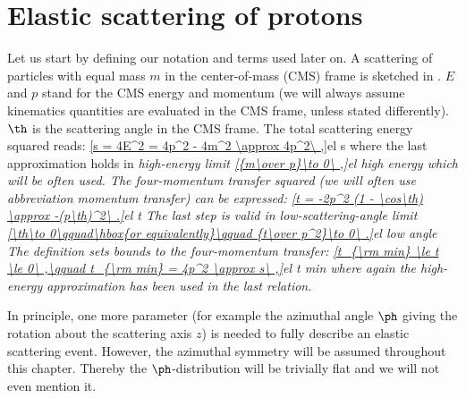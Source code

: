 \def\FC{F^{\rm C}}
\def\FH{F^{\rm H}}
\def\FCH{F^{\rm C+H}}
\def\e{{\rm e}}

\def\KL{Kudr\' at-Lokaj\' i\v cek}
\def\KaL{Kudr\' at and Lokaj\' i\v cek}
\def\WY{West-Yennie}
\def\WaY{West and Yennie}

\def\caption#1{%
	\vskip\baselineskip
	\em{#1}%
	\vskip\baselineskip
}

\iffalse
CMS, QCD, QFT, LHC, BFKL, HP, LxG, RMS, QED, QM, OPE, TPE, IR, KL, CKL, WY, SWY
ATLAS ALFA, TDR
\fi


\chapter{Elastic scattering of protons}


Let us start by defining our notation and terms used later on. A scattering of particles with equal mass $m$ in the center-of-mass (CMS) frame is sketched in . $E$ and $p$ stand for the CMS energy and momentum (we will always assume kinematics quantities are evaluated in the CMS frame, unless stated differently). $\th$ is the scattering angle in the CMS frame. The total scattering energy squared reads:
\eqref{s = 4E^2 = 4p^2 - 4m^2 \approx 4p^2\ ,}{el s}
where the last approximation holds in \em{high-energy} limit
\eqref{{m\over p}\to 0\ ,}{el high energy}
which will be often used. The four-momentum transfer squared (we will often use abbreviation momentum transfer) can be expressed:
\eqref{t = -2p^2 (1 - \cos\th) \approx -(p\th)^2\ .}{el t}
The last step is valid in \em{low-scattering-angle} limit
\eqref{\th\to 0\qquad\hbox{or equivalently}\qquad {t\over p^2}\to 0\ .}{el low angle}
The definition  sets bounds to the four-momentum transfer:
\eqref{t_{\rm min} \le t \le 0\ ,\qquad t_{\rm min} = 4p^2 \approx s\ ,}{el t min}
where again the high-energy approximation has been used in the last relation.

In principle, one more parameter (for example the azimuthal angle $\ph$ giving the rotation about the scattering axis $z$) is needed to fully describe an elastic scattering event. However, the azimuthal symmetry will be assumed throughout this chapter. Thereby the $\ph$-distribution will be trivially flat and we will not even mention it.

